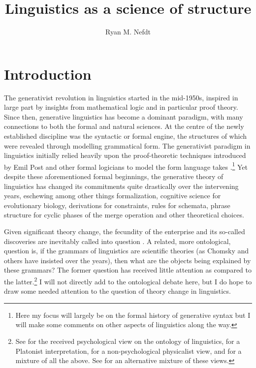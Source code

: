 \documentclass[output=paper]{langscibook}
\title{Linguistics as a science of structure}
\author{Ryan M. Nefdt \affiliation{University of the Western Cape}}
\begin{document}
\maketitle

\section{Introduction}
\label{sec:nefdt:intro}

The generativist revolution in linguistics started in the mid-1950s, inspired in large part by insights from mathematical logic and in particular proof theory. Since then, generative linguistics has become a dominant paradigm, with many connections to both the formal and natural sciences. At the centre of the newly established discipline was the syntactic or formal engine, the structures of which were revealed through modelling grammatical form. The generativist paradigm in linguistics initially relied heavily upon the proof-theoretic techniques introduced by Emil Post and other formal logicians to model the form language takes \citep{Tomalin2006, Pullum2011, Pullum2013}.\footnote{Here my focus will largely be on the formal history of generative syntax but I will make some comments on other aspects of linguistics along the way.} Yet despite these aforementioned formal beginnings, the generative theory of linguistics has changed its commitments quite drastically over the intervening years, eschewing among other things formalization, cognitive science for evolutionary biology, derivations for constraints, rules for schemata, phrase structure for cyclic phases of the merge operation and other theoretical choices.  

Given significant theory change, the fecundity of the enterprise and its so-called discoveries are inevitably called into question \citep{Stokhof2011,Lappin2000,Jackendoff2002}. A related, more ontological, question is, if the grammars of linguistics are scientific theories (as Chomsky and others have insisted over the years), then what are the objects being explained by these grammars? The former question has received little attention as compared to the latter.\footnote {See \cite{Chomsky1986} for the received psychological view on the ontology of linguistics, \cite{Katz1991} for a Platonist interpretation, \cite{Devitt2006} for a non-psychological physicalist view, and \cite{Stainton2014} for a mixture of all the above. See \cite{Nefdt:2018} for an alternative mixture of these views.} I will not directly add to the ontological debate here, but I do hope to draw some needed attention to the question of theory change in linguistics. 
\end{document}
